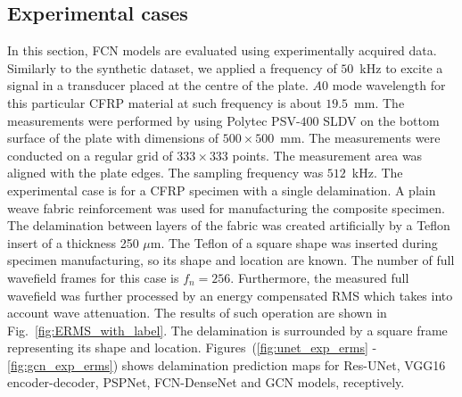 \subsection{Experimental cases}
\label{sec522}

In this section, FCN models are evaluated using experimentally acquired data.
Similarly to the synthetic dataset, we applied a frequency of \(50\)~kHz to excite a signal in a transducer placed at the centre of the plate. 
\(A0\) mode wavelength for this particular CFRP material at such frequency is about \(19.5\)~mm. 
The measurements were performed by using Polytec PSV-\(400\) SLDV on the bottom surface of the plate with dimensions of \(500\times 500\)~mm. 
The measurements were conducted on a regular grid of \(333\times333\) points. 
The measurement area was aligned with the plate edges.
The sampling frequency was \(512\)~kHz.
The experimental case is for a CFRP specimen with a single delamination.
A plain weave fabric reinforcement was used for manufacturing the composite specimen. 
The delamination between layers of the fabric was created artificially by a Teflon insert of a thickness 250 $\mu$m. 
The Teflon of a square shape was inserted during specimen manufacturing, so its shape and location are known. 
The number of full wavefield frames for this case is $f_n = 256$.
Furthermore, the measured full wavefield was further processed by an energy compensated RMS which takes into account wave attenuation. 
The results of such operation are shown in Fig.~\ref{fig:ERMS_with_label}.
The delamination is surrounded by a square frame representing its shape and location. 
Figures~(\ref{fig:unet_exp_erms} - \ref{fig:gcn_exp_erms}) shows delamination prediction maps for Res-UNet, VGG16 encoder-decoder, PSPNet, FCN-DenseNet and GCN models, receptively.

